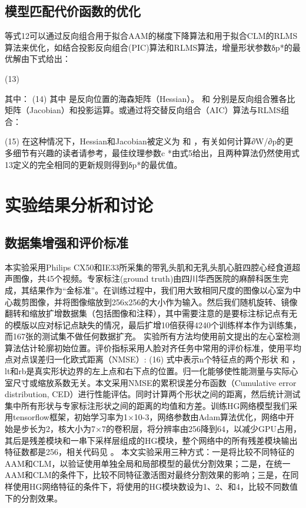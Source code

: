 \subsection{模型匹配代价函数的优化} 

等式12可以通过反向组合用于拟合AAM的梯度下降算法和用于拟合CLM的RLMS算法来优化，如结合投影反向组合(PIC)算法\citep{Jan2017}和RLMS算法，增量形状参数δp*的最优解由下式给出：

          (13)
          
其中：
	  	(14)
其中  是反向位置的海森矩阵（Hessian）。  和  分别是反向组合雅各比矩阵（Jacobian）和投影运算。或通过将交替反向组合（AIC）算法\citep{Jan2017}与RLMS组合：

 (15)
在这种情况下，Hessian和Jacobian被定义为  和  ，有关如何计算∂W/∂p的更多细节有兴趣的读者请参考\citep{Jan2017}，最佳纹理参数c *由式5给出，且两种算法仍然使用式13定义的完全相同的更新规则得到δp*的最优值。

\section{实验结果分析和讨论}
\subsection{数据集增强和评价标准}

本实验采用Philips CX50和IE33所采集的带乳头肌和无乳头肌心脏四腔心经食道超声图像，共45个视频。专家标注(ground truth)由四川华西医院的麻醉科医生完成，其结果作为“金标准”。在训练过程中，我们用大致相同尺度的图像以心室为中心裁剪图像，并将图像缩放到256x256的大小作为输入。然后我们随机旋转、镜像翻转和缩放扩增数据集（包括图像和注释），其中需要注意的是要标注标记点有无的模版以应对标记点缺失的情况，最后扩增10倍获得4240个训练样本作为训练集，而167张的测试集不做任何数据扩充。
实验所有方法均使用前文提出的左心室检测算法估计轮廓初始位置。评价指标采用人脸对齐任务中常用的评价标准，使用平均点对点误差归一化欧式距离（NMSE）:
	  	(16)
式中表示n个特征点的两个形状 和 ，lt和rb是真实形状边界的左上点和右下点的位置。归一化能够使性能测量与实际心室尺寸或缩放系数无关。本文采用NMSE的累积误差分布函数（Cumulative error distribution, CED）进行性能评估。同时计算两个形状之间的距离，然后统计测试集中所有形状与专家标注形状之间的距离的均值和方差。训练HG网络模型我们采用tensorflow框架，初始学习率为1×10-3，网络参数由Adam算法\citep{Kingma2014}优化，网络中开始是步长为2，核大小为7×7的卷积层，将分辨率由256降到64，以减少GPU占用，其后是残差模块和一串下采样层组成的HG模块，整个网络中的所有残差模块输出特征数都是256，相关代码见 。
本文实验采用三种方式：一是将比较不同特征的AAM和CLM，以验证使用单独全局和局部模型的最优分割效果；二是，在统一AAM和CLM的条件下，比较不同特征激活图对最终分割效果的影响；三是，在同样使用HG网络特征的条件下，将使用的HG模块数设为1、2、和4，比较不同数值下的分割效果。


